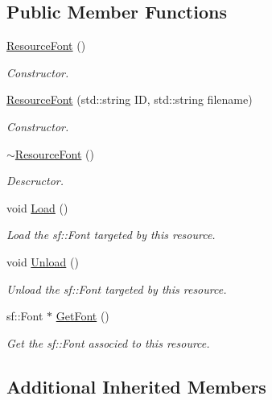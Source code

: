 \subsection*{Public Member Functions}
\begin{DoxyCompactItemize}
\item 
\mbox{\hyperlink{classsfmlbe_1_1_resource_font_a1b841c5e14a228a10db8a3d8c6ef2b0b}{Resource\+Font}} ()
\begin{DoxyCompactList}\small\item\em Constructor. \end{DoxyCompactList}\item 
\mbox{\hyperlink{classsfmlbe_1_1_resource_font_ad29b31b52682209630a6a8bba1999200}{Resource\+Font}} (std\+::string ID, std\+::string filename)
\begin{DoxyCompactList}\small\item\em Constructor. \end{DoxyCompactList}\item 
\mbox{\hyperlink{classsfmlbe_1_1_resource_font_a01aa16c3fae9a4027620308008ebbce0}{$\sim$\+Resource\+Font}} ()
\begin{DoxyCompactList}\small\item\em Descructor. \end{DoxyCompactList}\item 
void \mbox{\hyperlink{classsfmlbe_1_1_resource_font_a8629842a4597fa4c22e58a85ae76bc74}{Load}} ()
\begin{DoxyCompactList}\small\item\em Load the sf\+::\+Font targeted by this resource. \end{DoxyCompactList}\item 
void \mbox{\hyperlink{classsfmlbe_1_1_resource_font_a44911079325cd8fcf3f2bce64c58ff86}{Unload}} ()
\begin{DoxyCompactList}\small\item\em Unload the sf\+::\+Font targeted by this resource. \end{DoxyCompactList}\item 
sf\+::\+Font $\ast$ \mbox{\hyperlink{classsfmlbe_1_1_resource_font_a22f252c36d8554aade52e873d3331cce}{Get\+Font}} ()
\begin{DoxyCompactList}\small\item\em Get the sf\+::\+Font associed to this resource. \end{DoxyCompactList}\end{DoxyCompactItemize}
\subsection*{Additional Inherited Members}


